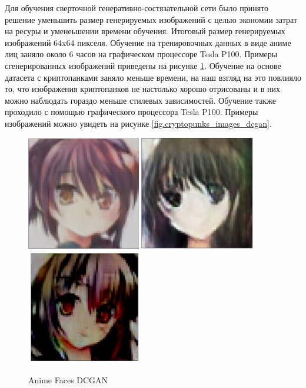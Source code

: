 Для обучения сверточной генеративно-состязательной сети было принято решение уменьшить размер генерируемых изображений с целью экономии затрат на ресуры и уменеьшении времени обучения. Итоговый размер генерируемых изображений 64x64 пикселя. Обучение на тренировочных данных в виде аниме лиц заняло около 6 часов на графическом процессоре Tesla P100. Примеры сгенерированных изображений приведены на рисунке {\color{blue} \ref{fig.anime_girls_dcgan}}.
Обучение на основе датасета с криптопанками заняло меньше времени, на наш взгляд на это повлияло то, что изображения криптопанков не настолько хорошо отрисованы и в них можно наблюдать гораздо меньше стилевых зависимостей. Обучение также проходило с помощью графического процессора Tesla P100. Примеры изображений можно увидеть на рисунке {\color{blue} \ref{fig.cryptopunks_images_dcgan}}.
\begin{figure}
    \centering
    \includegraphics[height=50mm, width=.3\textwidth]{fig/anime_girl_1_example_dcgan.png}\hfill
    \includegraphics[height=50mm, width=.3\textwidth]{fig/anime_girl_2_example_dcgan.png}\hfill
    \includegraphics[height=50mm, width=.3\textwidth]{fig/anime_girl_3_example_dcgan.png}
    \caption{Anime Faces DCGAN}
    \label{fig.anime_girls_dcgan}
\end{figure}


